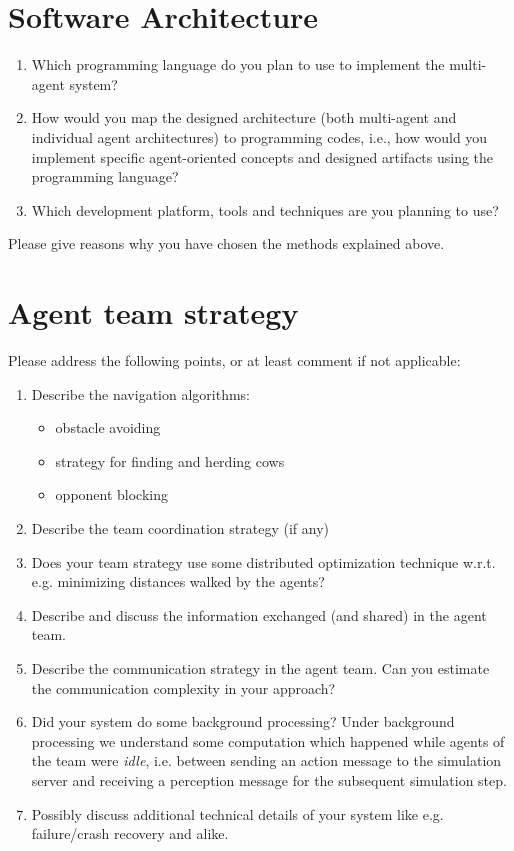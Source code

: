 \documentclass{llncs}
\begin{document}
\section{Software Architecture}

\begin{enumerate}
  \item Which programming language do you plan to use to implement the multi-agent system?
  \item How would you map the designed architecture (both multi-agent and individual agent architectures)
    to programming codes, i.e., how would you implement specific agent-oriented
    concepts and designed artifacts using the programming language?
  \item Which development platform, tools and techniques are you planning to use?

\end{enumerate}
Please give reasons why you have chosen the methods explained above.

\section{Agent team strategy}

Please address the following points, or at least comment if not applicable:

\begin{enumerate}
    \item Describe the navigation algorithms:
        \begin{itemize}
            \item obstacle avoiding
            \item strategy for finding and herding cows
            \item opponent blocking
        \end{itemize}
    \item Describe the team coordination strategy (if any)
    \item Does your team strategy use some distributed optimization
        technique w.r.t. e.g.  minimizing distances walked by the
        agents?
    \item Describe and discuss the information exchanged (and shared) in
        the agent team.
    \item Describe the communication strategy in the agent team. Can you
        estimate the communication complexity in your approach?
    \item Did your system do some background processing? Under background
        processing we understand some computation which happened while agents of
        the team were \textit{idle}, i.e. between sending an action
        message to the simulation server and receiving a perception
        message for the subsequent simulation step.
    \item Possibly discuss additional technical details of your system like
        e.g. failure/crash recovery and alike.
\end{enumerate}
\end{document}

